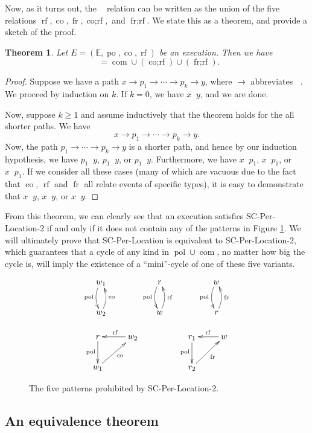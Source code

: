 \documentclass[]{eptcs}
\newtheorem{theorem}{Theorem}[section]
\DeclareMathOperator{\po}{po}
\DeclareMathOperator{\pol}{pol}
\DeclareMathOperator{\co}{co}
\DeclareMathOperator{\rf}{rf}
\DeclareMathOperator{\fr}{fr}
\DeclareMathOperator{\corf}{co;rf}
\DeclareMathOperator{\frrf}{fr;rf}
\DeclareMathOperator{\com}{com}
\DeclareMathOperator{\comp}{com^+}
\DeclareMathOperator{\coto}{\xrightarrow{co}}
\DeclareMathOperator{\rfto}{\xrightarrow{rf}}
\DeclareMathOperator{\frto}{\xrightarrow{fr}}
\DeclareMathOperator{\frrfto}{\xrightarrow{fr;rf}}
\DeclareMathOperator{\corfto}{\xrightarrow{co;rf}}
\DeclareMathOperator{\comto}{\xrightarrow{com}}
\begin{document}
Now, as it turns out, the $\comp$ relation can be written as the union of the five relations $\rf, \co, \fr, \corf,$ and $\frrf$. We state this as a theorem, and provide a sketch of the proof.

\begin{theorem}\label{rewrite_com+}
Let $E = (\mathbb{E}, \po, \co, \rf)$ be an execution. Then we have
\[
\comp = \com \cup (\corf ) \cup (\frrf).
\]
\end{theorem}
\begin{proof}
Suppose we have a path $x \to p_1 \to \cdots \to p_k \to y$, where $\to$ abbreviates $\comto$. We proceed by induction on $k$. If $k = 0$, we have $x \comto y$, and we are done.

Now, suppose $k \geq 1$ and assume inductively that the theorem holds for the all shorter paths. We have
\[
x \to p_1 \to \cdots \to p_k \to y.
\]
Now, the path $p_1 \to \cdots \to p_k \to y$ is a shorter path, and hence by our induction hypothesis, we have $p_1 \comto y$, $p_1 \corfto y$, or $p_1 \frrfto y$. Furthermore, we have $x \coto p_1$, $x \rfto p_1$, or $x \frto p_1$. If we consider all these cases (many of which are vacuous due to the fact that $\co$, $\rf$ and $\fr$ all relate events of specific types), it is easy to demonstrate that $x \comto y$, $x \corfto y$, or $x \frrfto y$.
\end{proof}

From this theorem, we can clearly see that an execution satisfies SC-Per-Location-2 if and only if it does not contain any of the patterns in Figure \ref{patterns}. We will ultimately prove that SC-Per-Location is equivalent to SC-Per-Location-2, which guarantees that a cycle of any kind in $\pol \cup \com$, no matter how big the cycle is, will imply the existence of a ``mini''-cycle of one of these five variants.

\begin{figure}
\[
\xymatrix{
w_1 \ar@/_0.5pc/[d]_{\pol} && r \ar@/_0.5pc/[d]_{\pol} && w \ar@/_0.5pc/[d]_{\pol} \\
w_2 \ar@/_0.5pc/[u]_{\co} && w \ar@/_0.5pc/[u]_{\rf} && r \ar@/_0.5pc/[u]_{\fr}
}
\]

\[
\xymatrix{
r \ar[d]_{\pol} & w_2 \ar[l]_{\rf} && r_1 \ar[d]_{\pol} & w \ar[l]_{\rf} \\
w_1 \ar[ur]_{\co} &&& r_2 \ar[ur]_{\fr}
}
\]
\caption{The five patterns prohibited by SC-Per-Location-2.}
\label{patterns}
\end{figure}

\subsection{An equivalence theorem}
\end{document}
